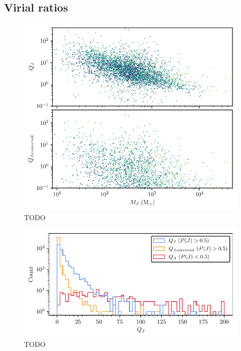 \subsection{Virial ratios}
\label{sec:dynamics:results:virial}

\begin{figure}[t]
    \centering
    \includegraphics[width=\textwidth]{fig/c4/results_virial_vs_mass.pdf}
    \caption[TODO]{TODO}
    \label{fig:dynamics:results:virial_vs_mass}
 \end{figure}

\begin{figure}[t]
    \centering
    \includegraphics[width=\textwidth]{fig/c4/results_q_distribution.pdf}
    \caption[TODO]{TODO}
    \label{fig:dynamics:results:virial_ratio_distribution}
 \end{figure}


